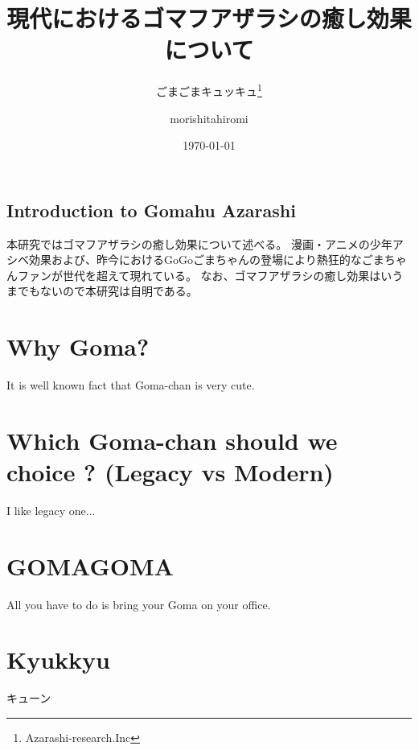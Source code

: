 \documentclass[12pt]{book}
\title{現代におけるゴマフアザラシの癒し効果について}
\author{ごまごまキュッキュ\thanks{Azarashi-research.Inc} \and morishitahiromi}
\date{\today}
\begin{document}
\maketitle


\frontmatter
\section{Introduction to Gomahu Azarashi}


本研究ではゴマフアザラシの癒し効果について述べる。
漫画・アニメの少年アシベ効果および、昨今におけるGoGoごまちゃんの登場により熱狂的なごまちゃんファンが世代を超えて現れている。
なお、ゴマフアザラシの癒し効果はいうまでもないので本研究は自明である。


\mainmatter
\chapter{Why Goma?}

It is well known fact that Goma-chan is very cute.

\chapter{Which Goma-chan should we choice ? (Legacy vs Modern)}

I like legacy one...

\appendix

\chapter{GOMAGOMA}

All you have to do is bring your Goma on your office.

\chapter{Kyukkyu}

キューン
\end{document}
